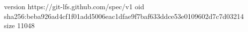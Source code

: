 version https://git-lfs.github.com/spec/v1
oid sha256:beba926ad4cf1f01add5006eac1dfae9f7baf633ddce53e0109602d7c7d03214
size 11048
